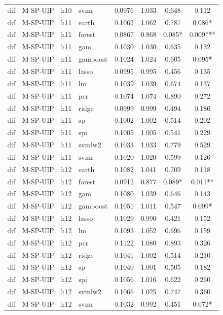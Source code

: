 \begin{ThreePartTable}
\begin{longtable}[t]{llclcccc}
dif & M-SP-UIP & h10 & svmr & 0.0976 & 1.033 & 0.648 & 0.112\\
\addlinespace
dif & M-SP-UIP & h11 & earth & 0.1062 & 1.062 & 0.787 & 0.086*\\
dif & M-SP-UIP & h11 & forest & 0.0867 & 0.868 & 0.085* & 0.009***\\
dif & M-SP-UIP & h11 & gam & 0.1030 & 1.030 & 0.635 & 0.132\\
dif & M-SP-UIP & h11 & gamboost & 0.1024 & 1.024 & 0.605 & 0.095*\\
dif & M-SP-UIP & h11 & lasso & 0.0995 & 0.995 & 0.456 & 0.135\\
dif & M-SP-UIP & h11 & lm & 0.1039 & 1.039 & 0.674 & 0.137\\
dif & M-SP-UIP & h11 & pcr & 0.1074 & 1.074 & 0.890 & 0.272\\
dif & M-SP-UIP & h11 & ridge & 0.0999 & 0.999 & 0.494 & 0.186\\
dif & M-SP-UIP & h11 & sp & 0.1002 & 1.002 & 0.514 & 0.202\\
dif & M-SP-UIP & h11 & spi & 0.1005 & 1.005 & 0.541 & 0.229\\
dif & M-SP-UIP & h11 & svmlw2 & 0.1033 & 1.033 & 0.779 & 0.529\\
dif & M-SP-UIP & h11 & svmr & 0.1020 & 1.020 & 0.599 & 0.126\\
\addlinespace
dif & M-SP-UIP & h12 & earth & 0.1082 & 1.041 & 0.709 & 0.118\\
dif & M-SP-UIP & h12 & forest & 0.0912 & 0.877 & 0.089* & 0.011**\\
dif & M-SP-UIP & h12 & gam & 0.1080 & 1.039 & 0.646 & 0.143\\
dif & M-SP-UIP & h12 & gamboost & 0.1051 & 1.011 & 0.547 & 0.099*\\
dif & M-SP-UIP & h12 & lasso & 0.1029 & 0.990 & 0.421 & 0.152\\
dif & M-SP-UIP & h12 & lm & 0.1093 & 1.052 & 0.696 & 0.159\\
dif & M-SP-UIP & h12 & pcr & 0.1122 & 1.080 & 0.893 & 0.326\\
dif & M-SP-UIP & h12 & ridge & 0.1041 & 1.002 & 0.514 & 0.210\\
dif & M-SP-UIP & h12 & sp & 0.1040 & 1.001 & 0.505 & 0.182\\
dif & M-SP-UIP & h12 & spi & 0.1056 & 1.016 & 0.622 & 0.260\\
dif & M-SP-UIP & h12 & svmlw2 & 0.1066 & 1.025 & 0.747 & 0.360\\
dif & M-SP-UIP & h12 & svmr & 0.1032 & 0.992 & 0.451 & 0.072*\\

\end{longtable}
\end{ThreePartTable}
